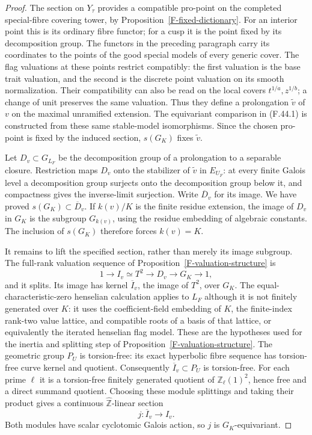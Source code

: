 \begin{proof}
The section on $Y_\tau$ provides a compatible pro-point
on the completed special-fibre covering tower, by
Proposition~\ref{F-fixed-dictionary}. For an interior
point this is its ordinary fibre functor; for a cusp it
is the point fixed by its decomposition group. The
functors in the preceding paragraph carry its coordinates
to the points of the good special models of every
generic cover. The flag valuations at these points
restrict compatibly: the first valuation is the base
trait valuation, and the second is the discrete
point valuation on its smooth normalization. Their
compatibility can also be read on the local covers
$t^{1/a},z^{1/b}$; a change of unit preserves the
same valuation. Thus they define a prolongation
$\widetilde v$ of $v$ on the maximal unramified extension.
The equivariant comparison in (F.44.1) is constructed
from these same stable-model isomorphisms. Since the
chosen pro-point is fixed by the induced section,
$s(G_K)$ fixes $\widetilde v$.

Let $D_v\subset G_{L_F}$ be the decomposition group of
a prolongation to a separable closure. Restriction maps
$D_v$ onto the stabilizer of $\widetilde v$ in
$E_{U_F}$: at every finite Galois level a decomposition
group surjects onto the decomposition group below it,
and compactness gives the inverse-limit surjection.
Write $\overline D_v$ for its image. We have proved
$s(G_K)\subset\overline D_v$. If $k(v)/K$ is the
finite residue extension, the image of $D_v$ in $G_K$
is the subgroup $G_{k(v)}$, using the residue embedding
of algebraic constants. The inclusion of $s(G_K)$
therefore forces $k(v)=K$.

It remains to lift the specified section, rather than
merely its image subgroup. The full-rank valuation
sequence of Proposition~\ref{F-valuation-structure} is
\[
 1\longrightarrow I_v\simeq T^2\longrightarrow D_v
        \longrightarrow G_K\longrightarrow1,
 \tag{F.44.2}
\]
and it splits. Its image has kernel
$\overline I_v$, the image of $T^2$, over $G_K$.
The equal-characteristic-zero henselian calculation
applies to $L_F$ although it is not finitely generated
over $K$: it uses the coefficient-field embedding of
$K$, the finite-index rank-two value lattice, and
compatible roots of a basis of that lattice, or
equivalently the iterated henselian flag model.
These are the hypotheses used for the inertia and
splitting step of Proposition~\ref{F-valuation-structure}.
The geometric group $P_U$ is torsion-free: its exact
hyperbolic fibre sequence has torsion-free curve kernel
and quotient. Consequently $\overline I_v\subset P_U$
is torsion-free. For each prime $\ell$ it is a
torsion-free finitely generated quotient of
$\mathbb Z_\ell(1)^2$, hence free and a direct summand
quotient. Choosing these module splittings and taking
their product gives a continuous
$\widehat{\mathbb Z}$-linear section
\[
                       j:\overline I_v\longrightarrow I_v.
\]
Both modules have scalar cyclotomic Galois action, so
$j$ is $G_K$-equivariant.


\end{proof}
